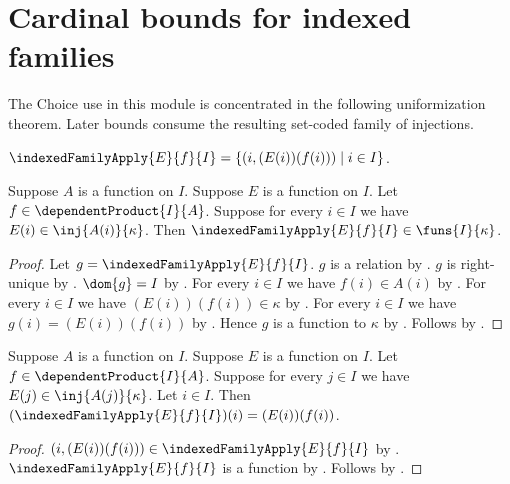 \section{Cardinal bounds for indexed families}





The Choice use in this module is concentrated in the following uniformization
theorem.  Later bounds consume the resulting set-coded family of injections.

\begin{definition}\label{indexed_family_apply}
    $\indexedFamilyApply{E}{f}{I}
        =\{(i,(E(i))(f(i)))\mid i\in I\}$.
\end{definition}

\begin{proposition}\label{indexed_family_apply_type}
    Suppose $A$ is a function on $I$.
    Suppose $E$ is a function on $I$.
    Let $f\in\dependentProduct{I}{A}$.
    Suppose for every $i\in I$ we have
        $E(i)\in\inj{A(i)}{\kappa}$.
    Then $\indexedFamilyApply{E}{f}{I}\in\funs{I}{\kappa}$.
\end{proposition}
\begin{proof}
    Let $g=\indexedFamilyApply{E}{f}{I}$.
    $g$ is a relation by .
    $g$ is right-unique
        by .
    $\dom{g}=I$
        by .
    For every $i\in I$ we have $f(i)\in A(i)$
        by .
    For every $i\in I$ we have $(E(i))(f(i))\in\kappa$
        by .
    For every $i\in I$ we have $g(i)=(E(i))(f(i))$
        by .
    Hence $g$ is a function to $\kappa$ by \auto.
    Follows by .
\end{proof}

\begin{proposition}\label{indexed_family_apply_application}
    Suppose $A$ is a function on $I$.
    Suppose $E$ is a function on $I$.
    Let $f\in\dependentProduct{I}{A}$.
    Suppose for every $j\in I$ we have
        $E(j)\in\inj{A(j)}{\kappa}$.
    Let $i\in I$.
    Then $(\indexedFamilyApply{E}{f}{I})(i)=(E(i))(f(i))$.
\end{proposition}
\begin{proof}
    $(i,(E(i))(f(i)))\in\indexedFamilyApply{E}{f}{I}$
        by .
    $\indexedFamilyApply{E}{f}{I}$ is a function
        by .
    Follows by .
\end{proof}

